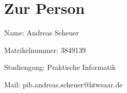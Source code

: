 \section{Zur Person}

Name: Andreas Scheuer

Matrikelnummer: 3849139

Studiengang: Praktische Informatik

Mail: pib.andreas.scheuer@htwsaar.de